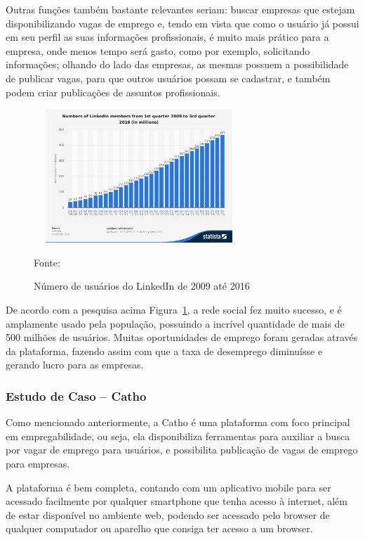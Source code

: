 Outras funções também bastante relevantes seriam: buscar empresas que estejam disponibilizando vagas de emprego e, tendo em vista que como o usuário já possui em seu perfil as suas informações profissionais, é muito mais prático para a empresa, onde menos tempo será gasto, como por exemplo, solicitando informações; olhando do lado das empresas, as mesmas possuem a possibilidade de publicar vagas, para que outros usuários possam se cadastrar, e também podem criar publicações de assuntos profissionais.

\begin{figure}[!h]
	\centering
			
	\caption{Número de usuários do LinkedIn de 2009 até 2016 }
	\includegraphics[width=300px, height=190px]{./images/linkedinMobile2.png}
	\label{fig:Número}
	\par {Fonte: \cite{linkedin-c}}
\end{figure}
\newpage

De acordo com a pesquisa acima Figura~\hypersetup{linkcolor=black}\ref{fig:Número}, a rede social fez muito sucesso, e é amplamente usado pela população, possuindo a incrível quantidade de mais de 500 milhões de usuários. Muitas oportunidades de emprego foram geradas através da plataforma, fazendo assim com que a taxa de desemprego diminuísse e gerando lucro para as empresas.


\subsubsection{Estudo de Caso – Catho}

Como mencionado anteriormente, a Catho é uma plataforma com foco principal em empregabilidade, ou seja, ela disponibiliza ferramentas para auxiliar a busca por vagar de emprego para usuários, e possibilita publicação de vagas de emprego para empresas.

A plataforma é bem completa, contando com um aplicativo mobile para ser acessado facilmente por qualquer smartphone que tenha acesso à internet, além de estar disponível no ambiente web, podendo ser acessado pelo browser de qualquer computador ou aparelho que consiga ter acesso a um browser.


